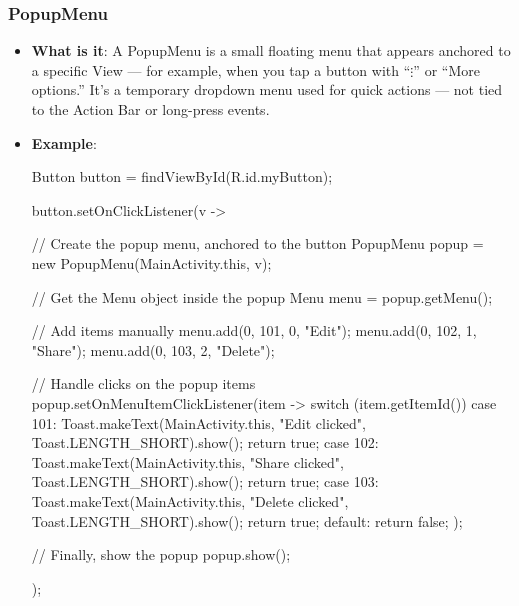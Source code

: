 \documentclass{report}
\begin{document}
    \subsubsection{PopupMenu}
    \begin{itemize}
        \item \textbf{What is it}: A PopupMenu is a small floating menu that appears anchored to a specific View — for example, when you tap a button with “$\vdots$” or “More options.”
            It’s a temporary dropdown menu used for quick actions — not tied to the Action Bar or long-press events.
            \bigbreak \noindent 
        \item \textbf{Example}:
            \bigbreak \noindent 
            \begin{javacode}
                Button button = findViewById(R.id.myButton);

                button.setOnClickListener(v -> {
                    // Create the popup menu, anchored to the button
                    PopupMenu popup = new PopupMenu(MainActivity.this, v);

                    // Get the Menu object inside the popup
                    Menu menu = popup.getMenu();

                    // Add items manually
                    menu.add(0, 101, 0, "Edit");
                    menu.add(0, 102, 1, "Share");
                    menu.add(0, 103, 2, "Delete");

                    // Handle clicks on the popup items
                    popup.setOnMenuItemClickListener(item -> {
                        switch (item.getItemId()) {
                            case 101:
                                Toast.makeText(MainActivity.this, "Edit clicked", Toast.LENGTH_SHORT).show();
                                return true;
                            case 102:
                                Toast.makeText(MainActivity.this, "Share clicked", Toast.LENGTH_SHORT).show();
                                return true;
                            case 103:
                                Toast.makeText(MainActivity.this, "Delete clicked", Toast.LENGTH_SHORT).show();
                                return true;
                            default:
                                return false;
                        }
                    });

                    // Finally, show the popup
                    popup.show();
                });
            \end{javacode}
            
    \end{itemize}
\end{document}
